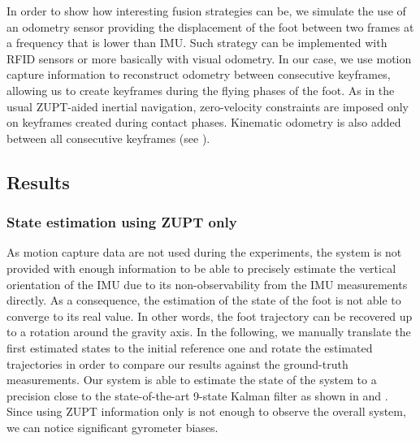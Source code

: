 In order to show how interesting fusion strategies can be, we simulate the use of an odometry sensor providing the displacement of the foot between two frames at a frequency that is lower than IMU. Such strategy can be implemented with
RFID sensors or more basically with visual odometry. In our case, we use motion capture information to reconstruct odometry between consecutive keyframes, allowing us to create keyframes during the flying phases of the foot. As in the usual ZUPT-aided inertial
navigation, zero-velocity constraints are imposed only on keyframes created during contact phases. Kinematic odometry is also added between all consecutive keyframes (see ).

%

\subsection{Results}
\subsubsection{State estimation using ZUPT only}

As motion capture data are not used during the experiments, the system is not provided with enough information to be able to precisely estimate the vertical orientation of the IMU due to its non-observability from the IMU measurements directly. 
As a consequence, the estimation of the state of the foot is not able to converge to its real value. In other words, the foot trajectory can be recovered up to a rotation around the gravity axis. 
In the following, we manually translate the first estimated states to the initial reference one and rotate the estimated trajectories in order to compare our results against the ground-truth measurements.
Our system is able to estimate the state of the system to a precision close to the state-of-the-art 9-state Kalman filter \cite{foxlin2005pedestrian} as shown in  and .
Since using ZUPT information only is not enough to observe the overall system, we can notice significant gyrometer biases.

